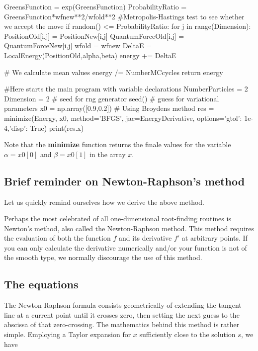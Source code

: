 \documentclass[%
oneside,                 %
final,                   %
10pt]{article}
\begin{document}
            GreensFunction = exp(GreensFunction)
            ProbabilityRatio = GreensFunction*wfnew**2/wfold**2
            #Metropolis-Hastings test to see whether we accept the move
            if random() <= ProbabilityRatio:
                for j in range(Dimension):
                    PositionOld[i,j] = PositionNew[i,j]
                    QuantumForceOld[i,j] = QuantumForceNew[i,j]
                wfold = wfnew
        DeltaE = LocalEnergy(PositionOld,alpha,beta)
        energy += DeltaE
            
    # We calculate mean values
    energy /= NumberMCcycles
    return energy




#Here starts the main program with variable declarations
NumberParticles = 2
Dimension = 2
# seed for rng generator 
seed()
# guess for variational parameters
x0 = np.array([0.9,0.2])
# Using Broydens method
res = minimize(Energy, x0, method='BFGS', jac=EnergyDerivative, options={'gtol': 1e-4,'disp': True})
print(res.x)

\epycod

Note that the \textbf{minimize} function returns the finale values for the variable $\alpha=x0[0]$ and $\beta=x0[1]$ in the array $x$. 

\subsection{Brief reminder on Newton-Raphson's method}

Let us quickly remind ourselves how we derive the above method.

Perhaps the most celebrated of all one-dimensional root-finding
routines is Newton's method, also called the Newton-Raphson
method. This method  requires the evaluation of both the
function $f$ and its derivative $f'$ at arbitrary points. 
If you can only calculate the derivative
numerically and/or your function is not of the smooth type, we
normally discourage the use of this method.

\subsection{The equations}

The Newton-Raphson formula consists geometrically of extending the
tangent line at a current point until it crosses zero, then setting
the next guess to the abscissa of that zero-crossing.  The mathematics
behind this method is rather simple. Employing a Taylor expansion for
$x$ sufficiently close to the solution $s$, we have
\end{document}
